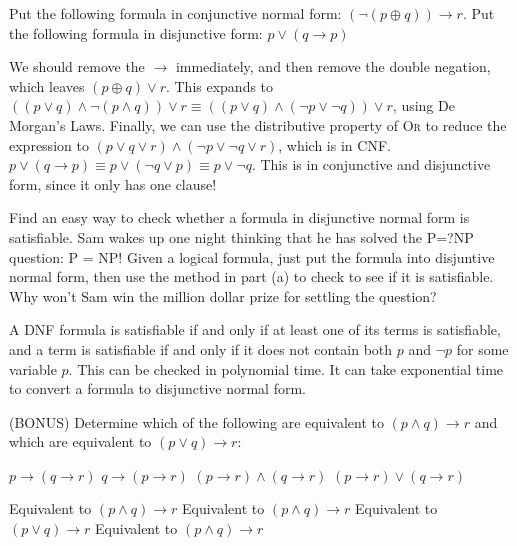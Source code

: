 \documentclass[solution, letterpaper]{cs20inclass}
\begin{document}
\problem

\subproblem Put the following formula in conjunctive normal form: $(\lnot (p \oplus q)) \rightarrow r$.
\subproblem Put the following formula in disjunctive form: $p \lor (q \rightarrow p)$

\begin{solution}
\subsolution We should remove the $\rightarrow$ immediately, and then remove the double negation, which leaves $(p \oplus q) \lor r$. This expands to $((p \lor q) \land \lnot (p \land q)) \lor r \equiv ((p \lor q) \land (\lnot p \lor \lnot q)) \lor r$, using De Morgan's Laws. Finally, we can use the distributive property of \textsc{Or} to reduce the expression to $(p \lor q \lor r) \land (\lnot p \lor \lnot q \lor r)$, which is in CNF.
\subsolution $p \lor (q \rightarrow p) \equiv p \lor (\lnot q \lor p) \equiv p \lor \lnot q$. This is in conjunctive and disjunctive form, since it only has one clause!
\end{solution}

\problem

\subproblem Find an easy way to check whether a formula in disjunctive normal form is satisfiable.
\subproblem Sam wakes up one night thinking that he has solved the P=?NP question:  P = NP!  Given a logical formula, just put the formula into disjuntive normal form, then use the method in part (a) to check to see if it is satisfiable. Why won't Sam win the million dollar prize for settling the question?

\begin{solution}
\subsolution A DNF formula is satisfiable if and only if at least one of its terms is satisfiable, and a term is satisfiable if and only if it does not contain both $p$ and $\lnot p$ for some variable $p$. This can be checked in polynomial time.
\subsolution It can take exponential time to convert a formula to disjunctive normal form.
\end{solution}

\problem

(BONUS) Determine which of the following are equivalent to $(p \land q) \rightarrow r$ and which are equivalent to $(p \lor q) \rightarrow r$:

\subproblem $p \rightarrow (q \rightarrow r)$
\subproblem $q \rightarrow (p \rightarrow r)$
\subproblem $(p \rightarrow r) \land (q \rightarrow r)$
\subproblem $(p \rightarrow r) \lor (q \rightarrow r)$

\begin{solution}
\subsolution Equivalent to $(p \land q) \rightarrow r$
\subsolution Equivalent to $(p \land q) \rightarrow r$
\subsolution Equivalent to $(p \lor q) \rightarrow r$
\subsolution Equivalent to $(p \land q) \rightarrow r$
\end{solution}
\end{document}
